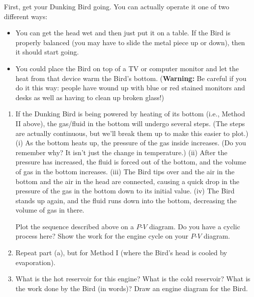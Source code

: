 \begin{exercise} 
  First, get your Dunking Bird going.  You can actually operate it one
  of two different ways:
  \begin{itemize}
  \item[(I)] You can get the head wet and then just put it on a table.
    If the Bird is properly balanced (you may have to slide the metal
    piece up or down), then it should start going.

  \item[(II)] You could place the Bird on top of a TV or computer
    monitor and let the heat from that device warm the Bird's bottom.
    (\textbf{Warning:} Be careful if you do it this way: people have
    wound up with blue or red stained monitors and desks as well as
    having to clean up broken glass!)
  \end{itemize}


  \begin{enumerate}
  \item If the Dunking Bird is being powered by heating of its bottom 
    (i.e., Method II above), the gas/fluid in the bottom will undergo
    several steps.  (The steps are actually continuous, but we'll
    break them up to make this easier to plot.)  (i) As the bottom heats
    up, the pressure of the gas inside increases.  (Do you remember
    why?  It isn't just the change in temperature.) (ii) After the
    pressure has increased, the fluid is forced out of the bottom, and
    the volume of gas in the bottom increases.  (iii) The Bird tips over
    and the air in the bottom and the air in the head are connected,
    causing a quick drop in the pressure of the gas in the bottom down
    to its initial value.  (iv) The Bird stands up again, and the
    fluid runs down into the bottom, decreasing the volume of gas in
    there.

    Plot the sequence described above on a $P$-$V$ diagram.  Do you
    have a cyclic process here?  Show the work for the engine cycle on
    your $P$-$V$ diagram.

  \item Repeat part (a), but for Method I (where the Bird's head is
    cooled by evaporation).

  \item What is the hot reservoir for this engine?  What is the cold
    reservoir?  What is the work done by the Bird (in words)?  Draw an
    engine diagram for the Bird.
 
  \end{enumerate}
\end{exercise}


